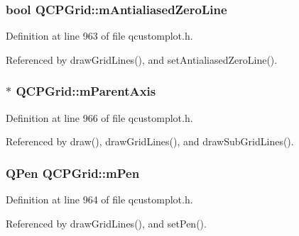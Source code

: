 \subsubsection[{m\+Antialiased\+Zero\+Line}]{\setlength{\rightskip}{0pt plus 5cm}bool Q\+C\+P\+Grid\+::m\+Antialiased\+Zero\+Line\hspace{0.3cm}{\ttfamily [protected]}}\label{class_q_c_p_grid_a8c0df56ae86440408c050895dcdb922b}


Definition at line 963 of file qcustomplot.\+h.



Referenced by draw\+Grid\+Lines(), and set\+Antialiased\+Zero\+Line().

\hypertarget{class_q_c_p_grid_a9a8a76731e6e737b65b929fd1995cc88}{}
\subsubsection[{m\+Parent\+Axis}]{$\ast$ Q\+C\+P\+Grid\+::m\+Parent\+Axis\hspace{0.3cm}{\ttfamily [protected]}}\label{class_q_c_p_grid_a9a8a76731e6e737b65b929fd1995cc88}


Definition at line 966 of file qcustomplot.\+h.



Referenced by draw(), draw\+Grid\+Lines(), and draw\+Sub\+Grid\+Lines().

\hypertarget{class_q_c_p_grid_a1cdc4a3bccf6a40c2d4360def9fefa40}{}
\subsubsection[{m\+Pen}]{\setlength{\rightskip}{0pt plus 5cm}Q\+Pen Q\+C\+P\+Grid\+::m\+Pen\hspace{0.3cm}{\ttfamily [protected]}}\label{class_q_c_p_grid_a1cdc4a3bccf6a40c2d4360def9fefa40}


Definition at line 964 of file qcustomplot.\+h.



Referenced by draw\+Grid\+Lines(), and set\+Pen().

\hypertarget{class_q_c_p_grid_aa9004bc139ad3ea92629f0aaae81d83f}{}
